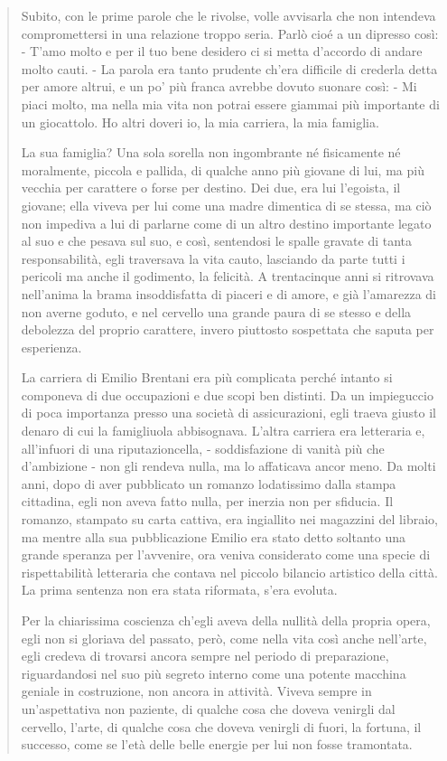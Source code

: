 \documentclass[a4paper, twoside, titlepage]{book}
\newcounter{mar}
\begin{document}
\setcounter{mar}{0}
\begin{quotation}
Subito, con le prime parole che le rivolse, volle avvisarla che non intendeva compromettersi in una relazione troppo seria. Parlò cioé a un dipresso così: - T’amo molto e per il tuo bene desidero ci si metta d’accordo di andare molto cauti. - La parola era tanto prudente ch’era difficile di crederla detta per amore altrui, e un po’ più franca avrebbe dovuto suonare così: - Mi piaci molto, ma nella mia vita non potrai essere giammai più importante di un giocattolo. Ho altri doveri io, la mia carriera, la mia famiglia.

La sua famiglia? Una sola sorella non ingombrante né fisicamente né moralmente, piccola e pallida, di qualche anno più giovane di lui, ma più vecchia per carattere o forse per destino. Dei due, era lui l’egoista, il giovane; ella viveva per lui come una madre dimentica di se stessa, ma ciò non impediva a lui di parlarne come di un altro destino importante legato al suo e che pesava sul suo, e così, sentendosi le spalle gravate di tanta responsabilità, egli traversava la vita cauto, lasciando da parte tutti i pericoli ma anche il godimento, la felicità. A trentacinque anni si ritrovava nell’anima la brama insoddisfatta di piaceri e di amore, e già l’amarezza di non averne goduto, e nel cervello una grande paura di se stesso e della debolezza del proprio carattere, invero piuttosto sospettata che saputa per esperienza.

La carriera di Emilio Brentani era più complicata perché intanto si componeva di due occupazioni e due scopi ben distinti. Da un impieguccio di poca importanza presso una società di assicurazioni, egli traeva giusto il denaro di cui la famigliuola abbisognava. L’altra carriera era letteraria e, all’infuori di una riputazioncella, - soddisfazione di vanità più che d’ambizione - non gli rendeva nulla, ma lo affaticava ancor meno. Da molti anni, dopo di aver pubblicato un romanzo lodatissimo dalla stampa cittadina, egli non aveva fatto nulla, per inerzia non per sfiducia. Il romanzo, stampato su carta cattiva, era ingiallito nei magazzini del libraio, ma mentre alla sua pubblicazione Emilio era stato detto soltanto una grande speranza per l’avvenire, ora veniva considerato come una specie di rispettabilità letteraria che contava nel piccolo bilancio artistico della città. La prima sentenza non era stata riformata, s’era evoluta.

Per la chiarissima coscienza ch’egli aveva della nullità della propria opera, egli non si gloriava del passato, però, come nella vita così anche nell’arte, egli credeva di trovarsi ancora sempre nel periodo di preparazione, riguardandosi nel suo più segreto interno come una potente macchina geniale in costruzione, non ancora in attività. Viveva sempre in un’aspettativa non paziente, di qualche cosa che doveva venirgli dal cervello, l’arte, di qualche cosa che doveva venirgli di fuori, la fortuna, il successo, come se l’età delle belle energie per lui non fosse tramontata.


\end{quotation}
\end{document}
